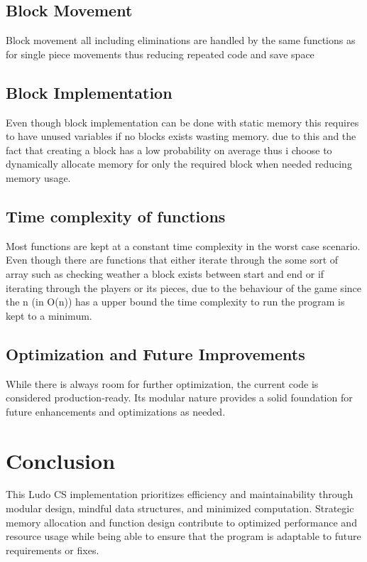 \documentclass{article}
\begin{document}
\subsection{Block Movement}

Block movement all including eliminations are handled by the same functions as for single piece movements thus reducing repeated code and save space

\subsection{Block Implementation}

Even though block implementation can be done with static memory this requires to have unused variables if no blocks exists wasting memory. due to this and the fact that creating a block has a low probability on average thus i choose to dynamically allocate memory for only the required block when needed reducing memory usage.

\subsection{Time complexity of functions}

Most functions are kept at a constant time complexity in the worst case scenario. Even though there are functions that either iterate through the some sort of array such as checking weather a block exists between start and end or if iterating through the players or its pieces, due to the behaviour of the game since the n (in O(n)) has a upper bound the time complexity to run the program is kept to a minimum.

\subsection{Optimization and Future Improvements}

While there is always room for further optimization, the current code is considered production-ready. Its modular nature provides a solid foundation for future enhancements and optimizations as needed. 

\section{Conclusion}

This Ludo CS implementation prioritizes efficiency and maintainability through modular design, mindful data structures, and minimized computation. Strategic memory allocation and function design contribute to optimized performance and resource usage while being able to ensure that the program is adaptable to future requirements or fixes.
\end{document}
